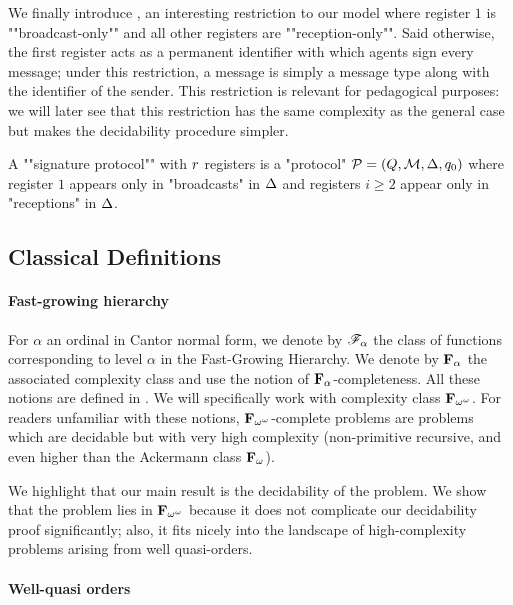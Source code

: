 \AP We finally introduce , an interesting restriction to our model where register $1$ is ""broadcast-only"" and all other registers are ""reception-only"". Said otherwise, the first register acts as a permanent identifier with which agents sign every message; under this restriction, a message is simply a message type along with the identifier of the sender. This restriction is relevant for pedagogical purposes: we will later see that this restriction has the same complexity as the general case but makes the decidability procedure simpler. 

\begin{definition}
A ""signature protocol"" with $r$ registers is a "protocol" $\mathcal{P} = (Q, \mathcal{M}, \Delta, q_0)$ where register $1$ appears only in "broadcasts" in $\Delta$ and registers $i \geq 2$ appear only in "receptions" in $\Delta$. 
\end{definition}

\subsection{Classical Definitions}


\paragraph*{Fast-growing hierarchy}

For $\alpha$ an ordinal in Cantor normal form, we denote by $\mathscr{F}_{\alpha}$ the class of functions corresponding to level $\alpha$ in the Fast-Growing Hierarchy. We denote by $\mathbf{F}_{\alpha}$ the associated complexity class and use the notion of $\mathbf{F}_{\alpha}$-completeness. All these notions are defined in \cite{Schmitz16}. We will specifically work with complexity class $\mathbf{F}_{\omega^{\omega}}$. For readers unfamiliar with these notions, $\mathbf{F}_{\omega^{\omega}}$-complete problems are problems which are decidable but with very high complexity (non-primitive recursive, and even higher than the Ackermann class $\mathbf{F}_{\omega}$). 

We highlight that our main result is the decidability of the problem. We show that the problem lies in $\mathbf{F}_{\omega^{\omega}}$ because it does not complicate our decidability proof significantly; also, it fits nicely into the landscape of high-complexity problems arising from well quasi-orders. 

\paragraph*{Well-quasi orders}

